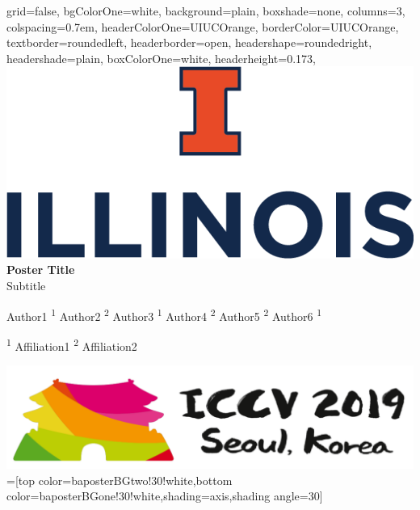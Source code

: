 \documentclass[landscape,paperwidth=182cm,paperheight=120cm, fontscale=0.17]{baposter}
\begin{document}
\begin{poster}{
    grid=false,
    bgColorOne=white,
    background=plain, %
    boxshade=none,
    columns=3,
    colspacing=0.7em,
    headerColorOne=UIUCOrange,
    borderColor=UIUCOrange,
    textborder=roundedleft, %
    headerborder=open,
    headershape=roundedright,
    headershade=plain,
    boxColorOne=white, %
    headerheight=0.173\textheight,
}
{
     \includegraphics[height=0.07\textheight]{templte_figs/uclogo_horz_bold}
}
{
    \sc \huge \textbf{Poster Title} \\
    Subtitle
}
{
    \Large
    \vspace{0.1cm}
    Author1 \textsuperscript{1} \hspace{0.15cm}
    Author2 \textsuperscript{2} \hspace{0.15cm}
    Author3 \textsuperscript{1} \hspace{0.15cm}
    Author4 \textsuperscript{2} \hspace{0.15cm}
    Author5 \textsuperscript{2} \hspace{0.15cm}
    Author6 \textsuperscript{1}
    \\ %
    {
        \vspace{-0.4cm}
        \begin{center}
            \textsuperscript{1} Affiliation1 \hspace{0.3cm}
            \textsuperscript{2} Affiliation2
        \end{center}
        \vspace{-0.8cm}
    }
}
{
    \includegraphics[height=0.07\textheight]{templte_figs/iccv19logo.png}
}
=[top color=baposterBGtwo!30!white,bottom color=baposterBGone!30!white,shading=axis,shading angle=30]



\end{poster}
\end{document}
